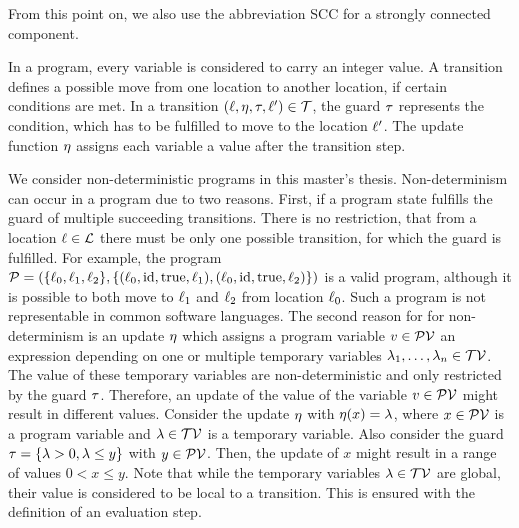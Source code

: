 From this point on, we also use the abbreviation SCC for a strongly connected component.

In a program, every variable is considered to carry an integer value.
A transition defines a possible move from one location to another location, if certain conditions are met.
In a transition $(\ell,\eta,\tau,\ell') \in \mathcal{T}$, the guard $\tau$ represents the condition, which has to be fulfilled to move to the location $\ell'$.
The update function $\eta$ assigns each variable a value after the transition step.

We consider non-deterministic programs in this master's thesis.
Non-determinism can occur in a program due to two reasons.
First, if a program state fulfills the guard of multiple succeeding transitions. 
There is no restriction, that from a location $\ell \in \mathcal{L}$ there must be only one possible transition, for which the guard is fulfilled.
For example, the program $\mathcal{P} = (\lbrace \ell_0,\ell_1,\ell_2 \rbrace,\lbrace (\ell_0,\text{id},\text{true},\ell_1),(\ell_0,\text{id},\text{true},\ell_2) \rbrace)$ is a valid program, although it is possible to both move to $\ell_1$ and $\ell_2$ from location $\ell_0$.
Such a program is not representable in common software languages.
The second reason for for non-determinism is an update $\eta$ which assigns a program variable $v \in \mathcal{PV}$ an expression depending on one or multiple temporary variables $\lambda_1, \dots, \lambda_n \in \mathcal{TV}$.
The value of these temporary variables are non-deterministic and only restricted by the guard $\tau$.
Therefore, an update of the value of the variable $v \in \mathcal{PV}$ might result in different values.
Consider the update $\eta$ with $\eta(x) = \lambda$, where $x \in \mathcal{PV}$ is a program variable and $\lambda \in \mathcal{TV}$ is a temporary variable.
Also consider the guard $\tau = \lbrace \lambda > 0, \lambda \leq y \rbrace$ with $y \in \mathcal{PV}$.
Then, the update of $x$ might result in a range of values $0 < x \leq y$. 
Note that while the temporary variables $\lambda \in \mathcal{TV}$ are global, their value is considered to be local to a transition.
This is ensured with the definition of an evaluation step.


